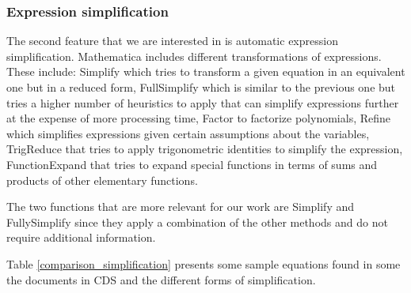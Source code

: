 \subsubsection{Expression simplification}
The second feature that we are interested in is automatic expression simplification.
Mathematica includes different transformations of expressions. These include: {\codefont Simplify} which tries to transform a given equation in an equivalent one but in a reduced form, {\codefont FullSimplify} which is similar to the previous one but tries a higher number of heuristics to apply that can simplify expressions further at the expense of more processing time, {\codefont Factor} to factorize polynomials, {\codefont Refine} which simplifies expressions given certain assumptions about the variables, {\codefont TrigReduce} that tries to apply trigonometric identities to simplify the expression, {\codefont FunctionExpand} that tries to expand special functions in terms of sums and products of other elementary functions. 

The two functions that are more relevant for our work are {\codefont Simplify} and {\codefont FullySimplify} since they apply a combination of the other methods and do not require additional information.

Table \ref{comparison_simplification} presents some sample equations found in some the documents in CDS and the different forms of simplification.

